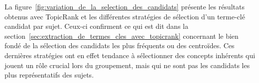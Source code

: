     La figure~\ref{fig:variation_de_la_selection_des_candidats} présente les
    résultats obtenus avec TopicRank et les différentes stratégies de sélection
    d'un terme-clé candidat par sujet. Ceux-ci confirment ce qui est dit dans la
    section~\ref{sec:extraction_de_termes_cles_avec_topicrank} concernant le
    bien fondé de la sélection des candidats les plus fréquents ou des
    centroïdes. Ces dernières stratégies ont en effet tendance à sélectionner
    des concepts inhérents qui jouent un rôle crucial lors du groupement, mais
    qui ne sont pas les candidats les plus représentatifs des sujets.
